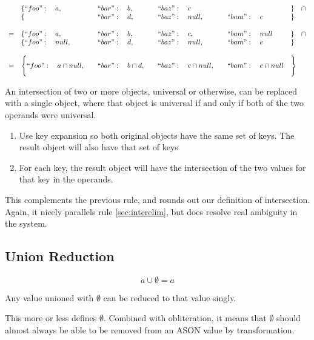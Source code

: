 \documentclass[letterpaper]{article}
\begin{document}
\begin{prule}
\begin{equation}
\begin{array}{rlllll}
& \{``foo":\quad a,\quad&``bar":\quad b,\quad&``baz":\quad c&&\}\quad\cap\\
& \{&``bar":\quad d,\quad&``baz":\quad null,\quad&``bam":\quad e&\} \\
\\
=&\{``foo":\quad a,\quad&``bar":\quad b,\quad&``baz":\quad c,\quad&``bam":\quad null&\}\quad\cap\\
 &\{``foo":\quad null,\quad&``bar":\quad d,\quad&``baz":\quad null,\quad&``bam":\quad e&\} \\
\\
=&\Bigg\{``foo":\quad a\cap null,\quad&``bar":\quad b\cap
d,\quad&``baz":\quad c\cap null,\quad&``bam":\quad e\cap null&\Bigg\}\\
\end{array}
\end{equation}

An intersection of two or more objects, universal or otherwise, can be replaced
with a single object, where that object is universal if and only if both of
the two operands were universal.
\begin{enumerate}
\item Use key expansion so both original objects have the same set of keys. The
result object will also have that set of keys
\item For each key, the result object will have the intersection of the two
values for that key in the operands.
\end{enumerate}
\end{prule}

This complements the previous rule, and rounds out our definition of
intersection. Again, it nicely parallels rule \ref{sec:interelim}, but does
resolve real ambiguity in the system.

\subsection{Union Reduction}
\begin{prule}
\begin{equation}
a\cup\emptyset = a
\end{equation}

Any value unioned with \(\emptyset\) can be reduced to that value singly.
\end{prule}

This more or less defines \(\emptyset\). Combined with obliteration, it means
that \(\emptyset\) should almost always be able to be removed from an ASON
value by transformation.
\end{document}
